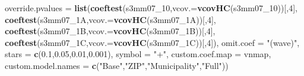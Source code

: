 \documentclass[
]{article}
\newenvironment{Shaded}{\begin{snugshade}}{\end{snugshade}}
\newcommand{\DataTypeTok}[1]{\textcolor[rgb]{0.13,0.29,0.53}{#1}}
\newcommand{\DecValTok}[1]{\textcolor[rgb]{0.00,0.00,0.81}{#1}}
\newcommand{\FloatTok}[1]{\textcolor[rgb]{0.00,0.00,0.81}{#1}}
\newcommand{\KeywordTok}[1]{\textcolor[rgb]{0.13,0.29,0.53}{\textbf{#1}}}
\newcommand{\NormalTok}[1]{#1}
\newcommand{\StringTok}[1]{\textcolor[rgb]{0.31,0.60,0.02}{#1}}
\begin{document}
\begin{Shaded}
\begin{Highlighting}[]
          \DataTypeTok{override.pvalues =} \KeywordTok{list}\NormalTok{(}\KeywordTok{coeftest}\NormalTok{(s3mm07_}\DecValTok{10}\NormalTok{,}\DataTypeTok{vcov.=}\KeywordTok{vcovHC}\NormalTok{(s3mm07_}\DecValTok{10}\NormalTok{))[,}\DecValTok{4}\NormalTok{],}
                                  \KeywordTok{coeftest}\NormalTok{(s3mm07_1A,}\DataTypeTok{vcov.=}\KeywordTok{vcovHC}\NormalTok{(s3mm07_1A))[,}\DecValTok{4}\NormalTok{],}
                                  \KeywordTok{coeftest}\NormalTok{(s3mm07_1B,}\DataTypeTok{vcov.=}\KeywordTok{vcovHC}\NormalTok{(s3mm07_1B))[,}\DecValTok{4}\NormalTok{],}
                                  \KeywordTok{coeftest}\NormalTok{(s3mm07_1C,}\DataTypeTok{vcov.=}\KeywordTok{vcovHC}\NormalTok{(s3mm07_1C))[,}\DecValTok{4}\NormalTok{]),}
          \DataTypeTok{omit.coef =} \StringTok{"(wave)"}\NormalTok{, }\DataTypeTok{stars =} \KeywordTok{c}\NormalTok{(}\FloatTok{0.1}\NormalTok{,}\FloatTok{0.05}\NormalTok{,}\FloatTok{0.01}\NormalTok{,}\FloatTok{0.001}\NormalTok{), }\DataTypeTok{symbol =} \StringTok{"+"}\NormalTok{,}
          \DataTypeTok{custom.coef.map =}\NormalTok{ vnmap, }
          \DataTypeTok{custom.model.names =} \KeywordTok{c}\NormalTok{(}\StringTok{"Base"}\NormalTok{,}\StringTok{"ZIP"}\NormalTok{,}\StringTok{"Municipality"}\NormalTok{,}\StringTok{"Full"}\NormalTok{))}
\end{Highlighting}
\end{Shaded}
\end{document}
